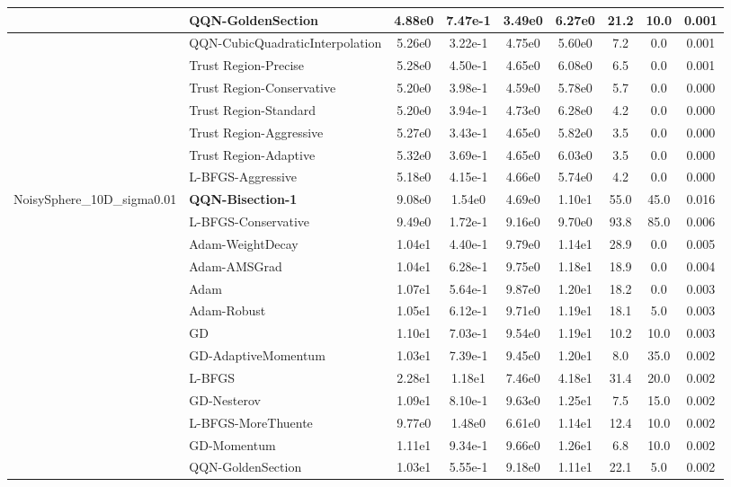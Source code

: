 \documentclass[10pt]{article}
\begin{document}
\begin{longtable}{|l|l|c|c|c|c|c|c|c|}
\hline
 & QQN-GoldenSection & 4.88e0 & 7.47e-1 & 3.49e0 & 6.27e0 & 21.2 & 10.0 & 0.001 \\
\hline
 & QQN-CubicQuadraticInterpolation & 5.26e0 & 3.22e-1 & 4.75e0 & 5.60e0 & 7.2 & 0.0 & 0.001 \\
\hline
 & Trust Region-Precise & 5.28e0 & 4.50e-1 & 4.65e0 & 6.08e0 & 6.5 & 0.0 & 0.001 \\
\hline
 & Trust Region-Conservative & 5.20e0 & 3.98e-1 & 4.59e0 & 5.78e0 & 5.7 & 0.0 & 0.000 \\
\hline
 & Trust Region-Standard & 5.20e0 & 3.94e-1 & 4.73e0 & 6.28e0 & 4.2 & 0.0 & 0.000 \\
\hline
 & Trust Region-Aggressive & 5.27e0 & 3.43e-1 & 4.65e0 & 5.82e0 & 3.5 & 0.0 & 0.000 \\
\hline
 & Trust Region-Adaptive & 5.32e0 & 3.69e-1 & 4.65e0 & 6.03e0 & 3.5 & 0.0 & 0.000 \\
\hline
 & L-BFGS-Aggressive & 5.18e0 & 4.15e-1 & 4.66e0 & 5.74e0 & 4.2 & 0.0 & 0.000 \\
NoisySphere\_10D\_sigma0.01 & \textbf{QQN-Bisection-1} & 9.08e0 & 1.54e0 & 4.69e0 & 1.10e1 & 55.0 & 45.0 & 0.016 \\
\hline
 & L-BFGS-Conservative & 9.49e0 & 1.72e-1 & 9.16e0 & 9.70e0 & 93.8 & 85.0 & 0.006 \\
\hline
 & Adam-WeightDecay & 1.04e1 & 4.40e-1 & 9.79e0 & 1.14e1 & 28.9 & 0.0 & 0.005 \\
\hline
 & Adam-AMSGrad & 1.04e1 & 6.28e-1 & 9.75e0 & 1.18e1 & 18.9 & 0.0 & 0.004 \\
\hline
 & Adam & 1.07e1 & 5.64e-1 & 9.87e0 & 1.20e1 & 18.2 & 0.0 & 0.003 \\
\hline
 & Adam-Robust & 1.05e1 & 6.12e-1 & 9.71e0 & 1.19e1 & 18.1 & 5.0 & 0.003 \\
\hline
 & GD & 1.10e1 & 7.03e-1 & 9.54e0 & 1.19e1 & 10.2 & 10.0 & 0.003 \\
\hline
 & GD-AdaptiveMomentum & 1.03e1 & 7.39e-1 & 9.45e0 & 1.20e1 & 8.0 & 35.0 & 0.002 \\
\hline
 & L-BFGS & 2.28e1 & 1.18e1 & 7.46e0 & 4.18e1 & 31.4 & 20.0 & 0.002 \\
\hline
 & GD-Nesterov & 1.09e1 & 8.10e-1 & 9.63e0 & 1.25e1 & 7.5 & 15.0 & 0.002 \\
\hline
 & L-BFGS-MoreThuente & 9.77e0 & 1.48e0 & 6.61e0 & 1.14e1 & 12.4 & 10.0 & 0.002 \\
\hline
 & GD-Momentum & 1.11e1 & 9.34e-1 & 9.66e0 & 1.26e1 & 6.8 & 10.0 & 0.002 \\
\hline
 & QQN-GoldenSection & 1.03e1 & 5.55e-1 & 9.18e0 & 1.11e1 & 22.1 & 5.0 & 0.002 \\

\end{longtable}
\end{document}
